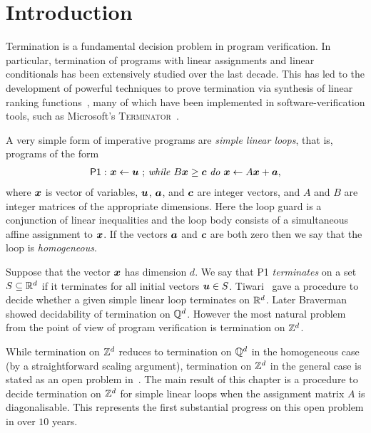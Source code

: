 \section{Introduction}
\label{sec:soda_intro}

Termination is a fundamental decision problem in program verification.
In particular, termination of programs with linear assignments and
linear conditionals has been extensively studied over the last decade.
This has led to the development of powerful techniques to
prove termination via synthesis of linear ranking
functions~\cite{Ben-AmramG13,BradleyMS05,ChenFM12,ColonS01,PodelskiR04},
many of which have been implemented in software-verification tools, such as
Microsoft's \textsc{Terminator}~\cite{CookPR06}.

A very simple form of imperative programs are \emph{simple linear
  loops}, that is, programs of the form
\begin{gather*}
\mathsf{P1:}\  \mbox{$\boldsymbol{x}\gets \boldsymbol{u}$ ;
\textit{while} $B\boldsymbol{x} \geq \boldsymbol{c}$ \textit{do}
$\boldsymbol{x}\leftarrow A\boldsymbol{x}+\boldsymbol{a}$,}
\end{gather*}
where $\boldsymbol{x}$ is vector of variables, $\boldsymbol{u}$,
$\boldsymbol{a}$, and $\boldsymbol{c}$ are integer vectors, and $A$
and $B$ are integer matrices of the appropriate dimensions.  Here the
loop guard is a conjunction of linear inequalities and the loop body
consists of a simultaneous affine assignment to $\boldsymbol{x}$.  If
the vectors $\boldsymbol{a}$ and $\boldsymbol{c}$ are both zero then
we say that the loop is \emph{homogeneous}.

Suppose that the vector $\boldsymbol{x}$ has dimension $d$.  We say
that \textsf{P1} \emph{terminates} on a set $S\subseteq \mathbb{R}^{d}$
if it terminates for all initial vectors $\boldsymbol{u} \in S$.
Tiwari~\cite{Tiw04} gave a procedure to decide whether a given simple
linear loop terminates on $\mathbb{R}^{d}$.  Later
Braverman~\cite{Bra06} showed decidability of termination on
$\mathbb{Q}^{d}$.  However the most natural problem from the point of
view of program verification is termination on $\mathbb{Z}^{d}$.

While termination on $\mathbb{Z}^{d}$ reduces to termination on
$\mathbb{Q}^{d}$ in the homogeneous case (by a straightforward scaling
argument), termination on $\mathbb{Z}^{d}$ in the general case is stated
as an open problem in~\cite{BGM12,Bra06,Tiw04}.  The main result of
this chapter is a procedure to decide termination on $\mathbb{Z}^{d}$ for
simple linear loops when the assignment matrix $A$ is diagonalisable.
This represents the first substantial progress on this open problem in
over $10$ years.

